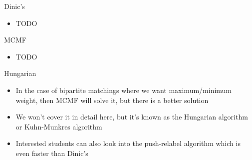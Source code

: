 \documentclass{beamer}
\begin{document}
	\begin{frame}[plain]{Dinic's}
		\begin{itemize}
			\item TODO
		\end{itemize}
	\end{frame}
	
	\begin{frame}[plain]{MCMF}
		\begin{itemize}
			\item TODO
		\end{itemize}
	\end{frame}
	
	\begin{frame}[plain]{Hungarian}
		\begin{itemize}
			\item In the case of bipartite matchings where we want maximum/minimum weight, then MCMF will solve it, but there is a better solution
			\item We won't cover it in detail here, but it's known as the Hungarian algorithm or Kuhn-Munkres algorithm
			\item Interested students can also look into the push-relabel algorithm which is even faster than Dinic's
		\end{itemize}
	\end{frame}
\end{document}
